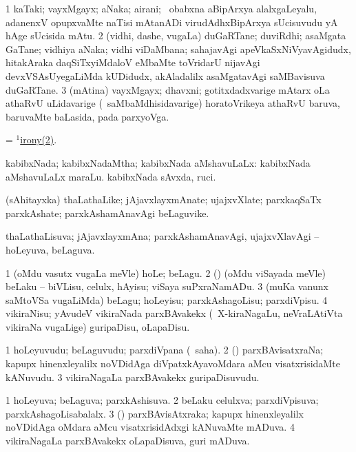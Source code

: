\bentry
{}
\gl{\nA}
\bmng
\bnum
\num{1} kaTaki; vayxMgayx; aNaka; airani; \kanmu\ obabxna aBipArxya alalxgaLeyalu, adanenxV opupxvaMte naTisi mAtanADi virudAdhxBipArxya sUcisuvudu yA hAge sUcisida mAtu. 
\hypertarget{irony(1)2}{} 
\num{2} (vidhi, dashe, \mo vugaLa) duGaRTane; duviRdhi; asaMgata GaTane; vidhiya aNaka; vidhi viDaMbana; sahajavAgi apeVkaSxNiVyavAgidudx, hitakAraka daqSiTxyiMdaloV eMbaMte toVridarU nijavAgi devxVSAsUyegaLiMda kUDidudx, akAladalilx asaMgatavAgi saMBavisuva duGaRTane. 
\num{3} (mAtina) vayxMgayx; dhavxni; gotitxdadxvarige mAtarx oLa athaRvU uLidavarige (\kanmu\ saMbaMdhisidavarige) horatoVrikeya athaRvU baruva, baruvaMte baLasida, pada parxyoVga. 
\enum
\emng

\noindent 
\gl{\pagu}
\bmng
{} = \hyperlink{irony(1)2}{$^1$irony(2)}. 
\emng
\eentry

\bentry
{}
\gl{\gu}
\bmng
kabibxNada; kabibxNadaMtha; kabibxNada aMshavuLaLx:  kabibxNada aMshavuLaLx maraLu.  kabibxNada sAvxda, ruci. 
\emng
\eentry

\bentry
{}
\gl{\nA}
\bmng
(sAhitayxka) thaLathaLike; jAjavxlayxmAnate; ujajxvXlate; parxkaqSaTx parxkAshate; parxkAshamAnavAgi beLaguvike. 
\emng
\eentry

\bentry
{}
\gl{\gu}
\bmng
thaLathaLisuva; jAjavxlayxmAna; parxkAshamAnavAgi, ujajxvXlavAgi -- hoLeyuva, beLaguva. 
\emng
\eentry

\bentry
{}
\gl{\sakirx}
\bmng
\bnum
\num{1} (oMdu vasutx \mo vugaLa meVle) hoLe; beLagu. 
\num{2} (\rUpa) (oMdu viSayada meVle) beLaku -- biVLisu, celulx, hAyisu; viSaya suPxraNamADu. 
\num{3} (muKa \mo vanunx saMtoVSa \mo vugaLiMda) beLagu; hoLeyisu; parxkAshagoLisu; parxdiVpisu. 
\num{4} vikiraNisu; yAvudeV vikiraNada parxBAvakekx (\udA\ X-kiraNagaLu, neVraLAtiVta vikiraNa \mo vugaLige) guripaDisu, oLapaDisu. 
\enum
\emng
\eentry

\bentry
{}
\gl{\nA}
\bmng
\bnum
\num{1} hoLeyuvudu; beLaguvudu; parxdiVpana (\rUpa\ saha). 
\num{2} (\daqvi) parxBAvisatxraNa; kapupx hinenxleyalilx noVDidAga diVpatxkAyavoMdara aMcu visatxrisidaMte kANuvudu. 
\num{3} vikiraNagaLa parxBAvakekx guripaDisuvudu. 
\enum
\emng
\eentry

\bentry
{}
\gl{\gu}
\bmng
\bnum
\num{1} hoLeyuva; beLaguva; parxkAshisuva. 
\num{2} beLaku celulxva; parxdiVpisuva; parxkAshagoLisabalalx. 
\num{3} (\daqvi) parxBAvisAtxraka; kapupx hinenxleyalilx noVDidAga oMdara aMcu visatxrisidAdxgi kANuvaMte mADuva. 
\num{4} vikiraNagaLa parxBAvakekx oLapaDisuva, guri mADuva. 
\enum
\emng
\eentry

